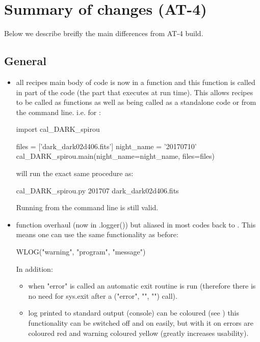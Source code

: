 \chapter{Summary of changes (AT-4)}
\label{ch:changelog}

Below we describe breifly the main differences from AT-4 build.

\section{General}
\begin{itemize}

\item all recipes main body of code is now in a  function and this function is called in  part of the code (the part that executes at run time). This allows recipes to be called as functions as well as being called as a standalone code or from the command line. i.e. for \calDARK:
	\begin{pythonbox}
	import cal_DARK_spirou
	    
	files = ['dark_dark02d406.fits']
	night_name = '20170710'
	cal_DARK_spirou.main(night_name=night_name, files=files)
	\end{pythonbox}
	will run the exact same procedure as:
	\begin{cmdbox}
	cal_DARK_spirou.py 201707 dark_dark02d406.fits
	\end{cmdbox}
	Running from the command line is still valid.

\item \WLOG function overhaul (now in \spirouLog.logger()) but aliased in most codes back to \WLOG. This means one can use the same functionality as before:
	\begin{pythonbox}
	WLOG("warning", "program", "message")
	\end{pythonbox}
	In addition:
	\begin{itemize}
	\item when "error" is called an automatic exit routine is run (therefore there is no need for sys.exit after a \WLOG("error", "", "") call).

	\item log printed to standard output (console) can be coloured (see ) this functionality can be switched off and on easily, but with it on errors are coloured red and warning coloured yellow (greatly increases usability).


\end{itemize}
\end{itemize}

